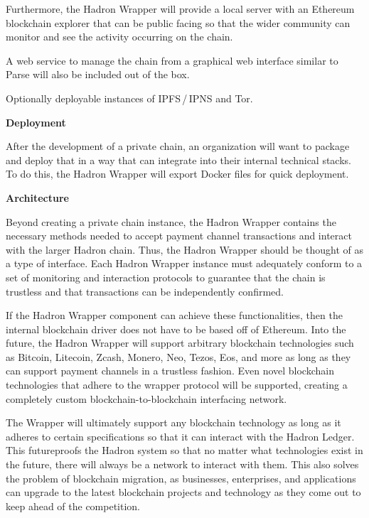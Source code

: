 \documentclass{%
	article}
\begin{document}
Furthermore, the Hadron Wrapper will provide a local server with an Ethereum blockchain explorer that can be public facing so that the wider community can monitor and see the activity occurring on the chain.

A web service to manage the chain from a graphical web interface similar to Parse will also be included out of the box.

Optionally deployable instances of IPFS\,/\,IPNS and Tor.

\begin{center}
\textbf{Deployment}
\end{center}

After the development of a private chain, an organization will want to package and deploy that in a way that can integrate into their internal technical stacks. To do this, the Hadron Wrapper will export Docker files for quick deployment.

\begin{center}
\textbf{Architecture}
\end{center}

Beyond creating a private chain instance, the Hadron Wrapper contains the necessary methods needed to accept payment channel transactions and interact with the larger Hadron chain. Thus, the Hadron Wrapper should be thought of as a type of interface. Each Hadron Wrapper instance must adequately conform to a set of monitoring and interaction protocols to guarantee that the chain is trustless and that transactions can be independently confirmed.

If the Hadron Wrapper component can achieve these functionalities, then the internal blockchain driver does not have to be based off of Ethereum. Into the future, the Hadron Wrapper will support arbitrary blockchain technologies such as Bitcoin, Litecoin, Zcash, Monero, Neo, Tezos, Eos, and more as long as they can support payment channels in a trustless fashion. Even novel blockchain technologies that adhere to the wrapper protocol will be supported, creating a completely custom blockchain-to-blockchain interfacing network.

The Wrapper will ultimately support any blockchain technology as long as it adheres to certain specifications so that it can interact with the Hadron Ledger. This futureproofs the Hadron system so that no matter what technologies exist in the future, there will always be a network to interact with them. This also solves the problem of blockchain migration, as businesses, enterprises, and applications can upgrade to the latest blockchain projects and technology as they come out to keep ahead of the competition.
\end{document}
